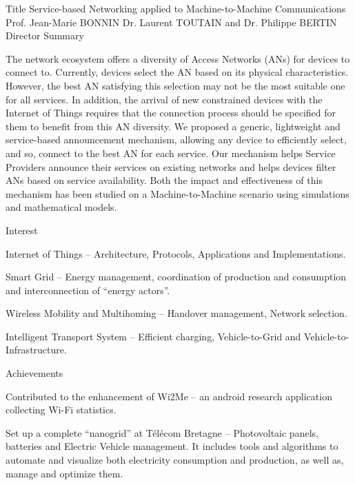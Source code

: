 \begin{cvhonors}
  \cvhonortwo
    {Title}
    {Service-based Networking applied to Machine-to-Machine Communications}
  \cvhonor
    {Prof. Jean-Marie BONNIN}
    {Dr. Laurent TOUTAIN and Dr. Philippe BERTIN}
    {}
    {Director}
  \cventryshort
    {Summary}
    {\begin{justify}
    \quad The network ecosystem offers a diversity of Access Networks (ANs) for devices to connect to. Currently, devices select the AN based on its physical characteristics. However, the best AN satisfying this selection may not be the most suitable one for all services. In addition, the arrival of new constrained devices with the Internet of Things requires that the connection process should be specified for them to benefit from this AN diversity. We proposed a generic, lightweight and service-based announcement mechanism, allowing any device to efficiently select, and so, connect to the best AN for each service. Our mechanism helps Service Providers announce their services on existing networks and helps devices filter ANs based on service availability. Both the impact and effectiveness of this mechanism has been studied on a Machine-to-Machine scenario using simulations and mathematical models.
    \end{justify}}


  \cventryshort   
    {Interest}
    {\begin{cvitems}
        \item {Internet of Things -- Architecture, Protocols, Applications and Implementations.}
        \item {Smart Grid -- Energy management, coordination of production and consumption and interconnection of ``energy actors''.}
        \item {Wireless Mobility and Multihoming -- Handover management, Network selection.}
        \item {Intelligent Transport System -- Efficient charging, Vehicle-to-Grid and Vehicle-to-Infrastructure.}
      \end{cvitems}
      }
  \cventryshort
    {Achievements}
    {\begin{cvitems}
        \item {Contributed to the enhancement of Wi2Me – an android research application collecting Wi-Fi statistics.}
        \item {Set up a complete ``nanogrid'' at T\'{e}l\'{e}com Bretagne -- Photovoltaic panels, batteries and Electric Vehicle management. It includes tools and algorithms to automate and visualize both electricity consumption and production, as well as, manage and optimize them.}
      \end{cvitems}
      }


\end{cvhonors}
